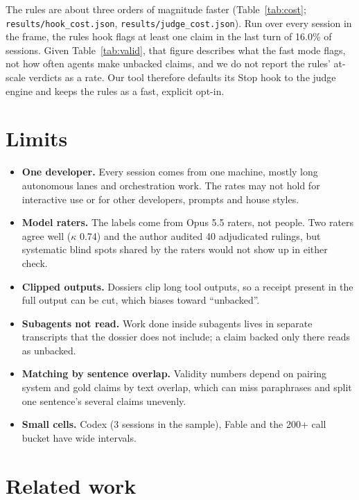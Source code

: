 \documentclass[11pt]{article}
\begin{document}
The rules are about three orders of magnitude faster (Table~\ref{tab:cost}; \texttt{results/hook\_cost.json},
\texttt{results/judge\_cost.json}). Run over every session in the frame, the rules hook flags at least one claim
in the last turn of 16.0\% of sessions. Given Table~\ref{tab:valid}, that figure describes what the fast mode
flags, not how often agents make unbacked claims, and we do not report the rules' at-scale verdicts as a rate.
Our tool therefore defaults its Stop hook to the judge engine and keeps the rules as a fast, explicit opt-in.

\section{Limits}

\begin{itemize}
\item \textbf{One developer.} Every session comes from one machine, mostly long autonomous lanes and orchestration
work. The rates may not hold for interactive use or for other developers, prompts and house styles.
\item \textbf{Model raters.} The labels come from Opus 5.5 raters, not people. Two raters agree well
($\kappa$ 0.74) and the author audited 40 adjudicated rulings, but systematic blind spots shared by the raters
would not show up in either check.
\item \textbf{Clipped outputs.} Dossiers clip long tool outputs, so a receipt present in the full output can be
cut, which biases toward ``unbacked''.
\item \textbf{Subagents not read.} Work done inside subagents lives in separate transcripts that the dossier does
not include; a claim backed only there reads as unbacked.
\item \textbf{Matching by sentence overlap.} Validity numbers depend on pairing system and gold claims by text
overlap, which can miss paraphrases and split one sentence's several claims unevenly.
\item \textbf{Small cells.} Codex (3 sessions in the sample), Fable and the 200+ call bucket have wide intervals.
\end{itemize}

\section{Related work}
\end{document}
